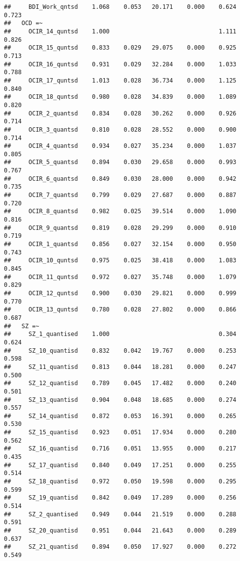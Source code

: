 \documentclass[]{article}
\begin{document}
\begin{verbatim}
##     BDI_Work_qntsd    1.068    0.053   20.171    0.000    0.624    0.723
##   OCD =~                                                                
##     OCIR_14_quntsd    1.000                               1.111    0.826
##     OCIR_15_quntsd    0.833    0.029   29.075    0.000    0.925    0.713
##     OCIR_16_quntsd    0.931    0.029   32.284    0.000    1.033    0.788
##     OCIR_17_quntsd    1.013    0.028   36.734    0.000    1.125    0.840
##     OCIR_18_quntsd    0.980    0.028   34.839    0.000    1.089    0.820
##     OCIR_2_quantsd    0.834    0.028   30.262    0.000    0.926    0.714
##     OCIR_3_quantsd    0.810    0.028   28.552    0.000    0.900    0.714
##     OCIR_4_quantsd    0.934    0.027   35.234    0.000    1.037    0.805
##     OCIR_5_quantsd    0.894    0.030   29.658    0.000    0.993    0.767
##     OCIR_6_quantsd    0.849    0.030   28.000    0.000    0.942    0.735
##     OCIR_7_quantsd    0.799    0.029   27.687    0.000    0.887    0.720
##     OCIR_8_quantsd    0.982    0.025   39.514    0.000    1.090    0.816
##     OCIR_9_quantsd    0.819    0.028   29.299    0.000    0.910    0.719
##     OCIR_1_quantsd    0.856    0.027   32.154    0.000    0.950    0.743
##     OCIR_10_quntsd    0.975    0.025   38.418    0.000    1.083    0.845
##     OCIR_11_quntsd    0.972    0.027   35.748    0.000    1.079    0.829
##     OCIR_12_quntsd    0.900    0.030   29.821    0.000    0.999    0.770
##     OCIR_13_quntsd    0.780    0.028   27.802    0.000    0.866    0.687
##   SZ =~                                                                 
##     SZ_1_quantised    1.000                               0.304    0.624
##     SZ_10_quantisd    0.832    0.042   19.767    0.000    0.253    0.598
##     SZ_11_quantisd    0.813    0.044   18.281    0.000    0.247    0.500
##     SZ_12_quantisd    0.789    0.045   17.482    0.000    0.240    0.501
##     SZ_13_quantisd    0.904    0.048   18.685    0.000    0.274    0.557
##     SZ_14_quantisd    0.872    0.053   16.391    0.000    0.265    0.530
##     SZ_15_quantisd    0.923    0.051   17.934    0.000    0.280    0.562
##     SZ_16_quantisd    0.716    0.051   13.955    0.000    0.217    0.435
##     SZ_17_quantisd    0.840    0.049   17.251    0.000    0.255    0.514
##     SZ_18_quantisd    0.972    0.050   19.598    0.000    0.295    0.599
##     SZ_19_quantisd    0.842    0.049   17.289    0.000    0.256    0.514
##     SZ_2_quantised    0.949    0.044   21.519    0.000    0.288    0.591
##     SZ_20_quantisd    0.951    0.044   21.643    0.000    0.289    0.637
##     SZ_21_quantisd    0.894    0.050   17.927    0.000    0.272    0.549

\end{verbatim}
\end{document}
